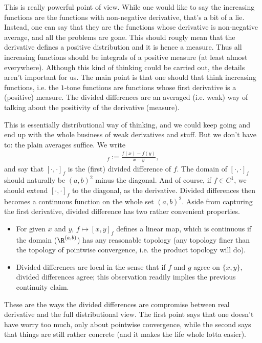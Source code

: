 This is really powerful point of view. While one would like to say the increasing functions are the functions with non-negative derivative, that's a bit of a lie. Instead, one can say that they are the functions whose derivative is non-negative average, and all the problems are gone. This should rougly mean that the derivative defines a positive distribution and it is hence a measure. Thus all increasing functions should be integrals of a positive measure (at least almost everywhere). Although this kind of thinking could be carried out, the details aren't important for us. The main point is that one should that think increasing functions, i.e. the $1$-tone functions are functions whose first derivative is a (positive) measure. The divided differences are an averaged (i.e. weak) way of talking about the positivity of the derivative (measure).

This is essentially distributional way of thinking, and we could keep going and end up with the whole business of weak derivatives and stuff. But we don't have to: the plain averages suffice. We write
\begin{align*}
	[x, y]_{f} := \frac{f(x) - f(y)}{x - y},
\end{align*}
and say that $[\cdot, \cdot]_{f}$ is the (first) divided difference of $f$. The domain of $[\cdot, \cdot]_{f}$ should naturally be $(a, b)^{2}$ minus the diagonal. And of course, if $f \in C^{1}$, we should extend $[\cdot, \cdot]_{f}$ to the diagonal, as the derivative. Divided differences then becomes a continuous function on the whole set $(a, b)^2$. Aside from capturing the first derivative, divided difference has two rather convenient properties.

\begin{itemize}
	\item For given $x$ and $y$, $f \mapsto [x, y]_{f}$ defines a linear map, which is continuous if the domain ($\R^{(a, b)}$) has any reasonable topology (any topology finer than the topology of pointwise convergence, i.e. the product topology will do).
	\item Divided differences are local in the sense that if $f$ and $g$ agree on $\{x, y\}$, divided differences agree; this observation readily implies the previous continuity claim.
\end{itemize}

These are the ways the divided differences are compromise between real derivative and the full distributional view. The first point says that one doesn't have worry too much, only about pointwise convergence, while the second says that things are still rather concrete (and it makes the life whole lotta easier).


